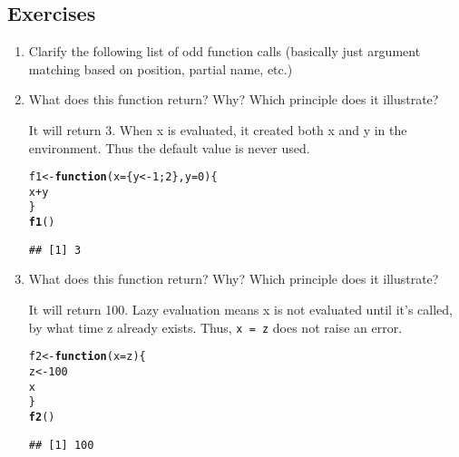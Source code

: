 \documentclass{article}\usepackage[]{graphicx}\usepackage[]{color}
\makeatletter
\newcommand{\hlnum}[1]{\textcolor[rgb]{0.686,0.059,0.569}{#1}}%
\newcommand{\hlopt}[1]{\textcolor[rgb]{0,0,0}{#1}}%
\newcommand{\hlstd}[1]{\textcolor[rgb]{0.345,0.345,0.345}{#1}}%
\newcommand{\hlkwa}[1]{\textcolor[rgb]{0.161,0.373,0.58}{\textbf{#1}}}%
\newcommand{\hlkwb}[1]{\textcolor[rgb]{0.69,0.353,0.396}{#1}}%
\newcommand{\hlkwc}[1]{\textcolor[rgb]{0.333,0.667,0.333}{#1}}%
\newcommand{\hlkwd}[1]{\textcolor[rgb]{0.737,0.353,0.396}{\textbf{#1}}}%
\newenvironment{kframe}{%
 \def\at@end@of@kframe{}%
 \ifinner\ifhmode%
  \def\at@end@of@kframe{\end{minipage}}%
  \begin{minipage}{\columnwidth}%
 \fi\fi%
 \def\FrameCommand##1{\hskip\@totalleftmargin \hskip-\fboxsep
 \colorbox{shadecolor}{##1}\hskip-\fboxsep
     \hskip-\linewidth \hskip-\@totalleftmargin \hskip\columnwidth}%
 \MakeFramed {\advance\hsize-\width
   \@totalleftmargin\z@ \linewidth\hsize
   \@setminipage}}%
 {\par\unskip\endMakeFramed%
 \at@end@of@kframe}
\newenvironment{knitrout}{}{} %
\makeatother
\begin{document}
\subsection{Exercises}
\begin{enumerate}
\item Clarify the following list of odd function calls (basically just argument matching based on position, partial name, etc.)

\item What does this function return? Why? Which principle does it illustrate?

It will return 3. When x is evaluated, it created both x and y in the environment. Thus the default value is never used.

\begin{knitrout}
\color{fgcolor}\begin{kframe}
\begin{alltt}
\hlstd{f1} \hlkwb{<-} \hlkwa{function}\hlstd{(}\hlkwc{x} \hlstd{= \{y} \hlkwb{<-} \hlnum{1}\hlstd{;} \hlnum{2}\hlstd{\},} \hlkwc{y} \hlstd{=} \hlnum{0}\hlstd{) \{}
  \hlstd{x} \hlopt{+} \hlstd{y}
\hlstd{\}}
\hlkwd{f1}\hlstd{()}
\end{alltt}
\begin{verbatim}
## [1] 3
\end{verbatim}
\end{kframe}
\end{knitrout}

\item What does this function return? Why? Which principle does it illustrate?

It will return 100. Lazy evaluation means x is not evaluated until it's called, by what time z already exists. Thus, \verb`x = z` does not raise an error.
\begin{knitrout}
\color{fgcolor}\begin{kframe}
\begin{alltt}
\hlstd{f2} \hlkwb{<-} \hlkwa{function}\hlstd{(}\hlkwc{x} \hlstd{= z) \{}
  \hlstd{z} \hlkwb{<-} \hlnum{100}
  \hlstd{x}
\hlstd{\}}
\hlkwd{f2}\hlstd{()}
\end{alltt}
\begin{verbatim}
## [1] 100
\end{verbatim}
\end{kframe}
\end{knitrout}
\end{enumerate}
\end{document}
